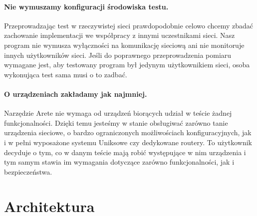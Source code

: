 \documentclass[00-praca-magisterska.tex]{subfiles}
\begin{document}
\paragraph{Nie wymuszamy konfiguracji środowiska testu.} Przeprowadzając test w
rzeczywistej sieci prawdopodobnie celowo chcemy zbadać zachowanie implementacji
we współpracy z innymi uczestnikami sieci. Nasz program nie wymusza wyłączności
na komunikację sieciową ani nie monitoruje innych użytkowników sieci. Jeśli do
poprawnego przeprowadzenia pomiaru wymagane jest, aby testowany program był
jedynym użytkownikiem sieci, osoba wykonująca test sama musi o to zadbać.

\paragraph{O urządzeniach zakładamy jak najmniej.} Narzędzie Arete nie
wymaga od urządzeń biorących udział w teście żadnej funkcjonalności.
Dzięki temu jesteśmy w stanie obsługiwać zarówno tanie urządzenia sieciowe, o
bardzo ograniczonych możliwościach konfiguracyjnych, jak i w pełni wyposażone
systemu Uniksowe czy dedykowane routery. To użytkownik decyduje o tym, co w
danym teście mają robić występujące w nim urządzenia i tym samym stawia
im wymagania dotyczące zarówno funkcjonalności, jak i bezpieczeństwa.

\section{Architektura}

\end{document}
